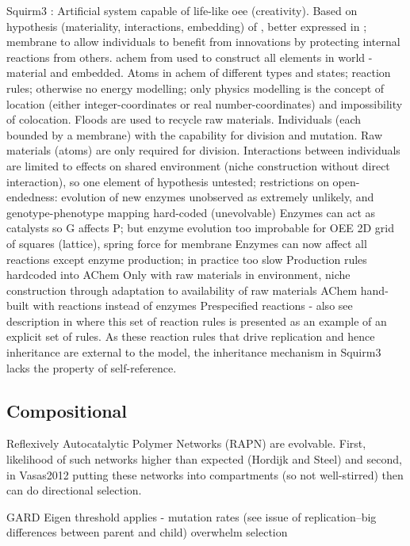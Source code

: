 Squirm3 \cite{Hutton2007,Hutton2002}:
Artificial system capable of life-like \gls{oee} (creativity).
Based on hypothesis (materiality, interactions, embedding) of \textcite{Taylor2001}, better expressed in \textcite[p.341]{Hutton2002}; membrane to allow individuals to benefit from innovations by protecting internal reactions from others.
\Gls{achem} from \textcite{Hutton2002} used to construct all elements in world - material and embedded.
Atoms in \gls{achem} of different types and states; reaction rules; otherwise no energy modelling; only physics modelling is the concept of location (either integer-coordinates or real number-coordinates) and impossibility of colocation. Floods are used to recycle raw materials.
Individuals (each bounded by a membrane) with the capability for division and mutation. Raw materials (atoms) are only required for division.
Interactions between individuals are limited to effects on shared environment (niche construction without direct interaction), so one element of hypothesis untested; restrictions on open-endedness: evolution of new enzymes unobserved as extremely unlikely, and genotype-phenotype mapping hard-coded (unevolvable)
Enzymes can act as catalysts so G affects P; but enzyme evolution too improbable for OEE
2D grid of squares (lattice), spring force for membrane
Enzymes can now affect all reactions except enzyme production; in practice too slow
Production rules hardcoded into AChem
Only with raw materials in environment, niche construction through adaptation to availability of raw materials
AChem hand-built with reactions instead of enzymes
Prespecified reactions \parencite[p.4]{Hutton2007}- also see description in \cite[p.49]{Faulconbridge2011} where this set of reaction rules is presented as an example of an explicit set of rules. As these reaction rules that drive replication and hence inheritance are external to the model, the inheritance mechanism in Squirm3 lacks the property of self-reference.

\subsection{Compositional}

\cite{Kauffman1986}
Reflexively Autocatalytic Polymer Networks (RAPN) are evolvable. First, likelihood of such networks higher than expected (Hordijk and Steel) and second, in Vasas2012 putting these networks into compartments (so not well-stirred) then can do directional selection.

GARD \parencite{Segre1998}
Eigen threshold applies - mutation rates (see issue of replication--big differences between parent and child) overwhelm selection \parencite{Vasas2015, Vasas2012, Vasas2012a}

